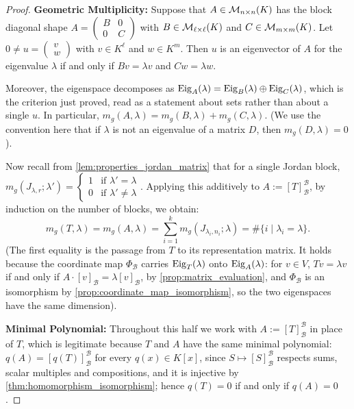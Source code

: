 \begin{proof}
\textbf{Geometric Multiplicity:} Suppose that $A \in \mathcal{M}_{n \times n}(K)$ has the block diagonal shape $A = \left(\begin{smallmatrix} B & 0 \\ 0 & C \end{smallmatrix}\right)$ with $B \in \mathcal{M}_{\ell \times \ell}(K)$ and $C \in \mathcal{M}_{m \times m}(K)$. Let $0 \neq u = \left(\begin{smallmatrix} v \\ w \end{smallmatrix}\right)$ with $v \in K^\ell$ and $w \in K^m$. Then $u$ is an eigenvector of $A$ for the eigenvalue $\lambda$ if and only if $Bv = \lambda v$ and $Cw = \lambda w$.

Moreover, the eigenspace decomposes as $\operatorname{Eig}_A(\lambda) = \operatorname{Eig}_B(\lambda) \oplus \operatorname{Eig}_C(\lambda)$, which is the criterion just proved, read as a statement about sets rather than about a single $u$. In particular, $m_g(A, \lambda) = m_g(B, \lambda) + m_g(C, \lambda)$. (We use the convention here that if $\lambda$ is not an eigenvalue of a matrix $D$, then $m_g(D, \lambda) = 0$).

Now recall from \cref{lem:properties_jordan_matrix} that for a single Jordan block, $m_g(J_{\lambda, r}; \lambda') = \begin{cases} 1 & \text{if } \lambda' = \lambda \\ 0 & \text{if } \lambda' \neq \lambda \end{cases}$.
Applying this additively to $A := [T]_{\mathcal{B}}^{\mathcal{B}}$, by induction on the number of blocks, we obtain:
\[
m_g(T, \lambda) = m_g(A, \lambda) = \sum_{i=1}^k m_g(J_{\lambda_i, n_i}; \lambda) = \# \{ i \mid \lambda_i = \lambda \}.
\]
(The first equality is the passage from $T$ to its representation matrix. It holds because the coordinate map $\Phi_{\mathcal{B}}$ carries $\operatorname{Eig}_T(\lambda)$ onto $\operatorname{Eig}_A(\lambda)$: for $v \in V$, $Tv = \lambda v$ if and only if $A \cdot [v]_{\mathcal{B}} = \lambda [v]_{\mathcal{B}}$, by \cref{prop:matrix_evaluation}, and $\Phi_{\mathcal{B}}$ is an isomorphism by \cref{prop:coordinate_map_isomorphism}, so the two eigenspaces have the same dimension).

\textbf{Minimal Polynomial:} Throughout this half we work with $A := [T]_{\mathcal{B}}^{\mathcal{B}}$ in place of $T$, which is legitimate because $T$ and $A$ have the same minimal polynomial: $q(A) = [q(T)]_{\mathcal{B}}^{\mathcal{B}}$ for every $q(x) \in K[x]$, since $S \mapsto [S]_{\mathcal{B}}^{\mathcal{B}}$ respects sums, scalar multiples and compositions, and it is injective by \cref{thm:homomorphism_isomorphism}; hence $q(T) = 0$ if and only if $q(A) = 0$.


\end{proof}
